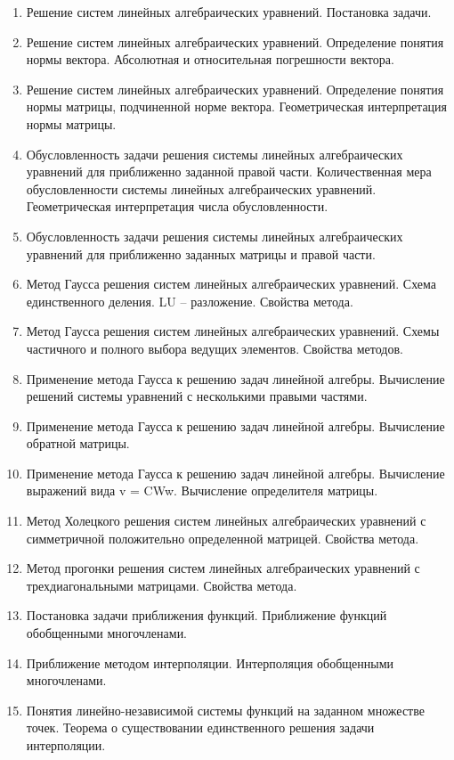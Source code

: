\documentclass[14pt]{extarticle}
\begin{document}
\begin{enumerate}
    \item Решение систем линейных алгебраических уравнений. Постановка задачи. 
    \item Решение систем линейных алгебраических уравнений. Определение понятия нормы вектора. Абсолютная и относительная погрешности вектора. 
    \item Решение систем линейных алгебраических уравнений. Определение понятия нормы матрицы, подчиненной норме вектора. Геометрическая интерпретация нормы матрицы. 
    \item Обусловленность задачи решения системы линейных алгебраических уравнений для приближенно заданной правой части. Количественная мера обусловленности системы линейных алгебраических уравнений. Геометрическая интерпретация числа обусловленности. 
    \item Обусловленность задачи решения системы линейных алгебраических уравнений для приближенно заданных матрицы и правой части. 
    \item Метод Гаусса решения систем линейных алгебраических уравнений. Схема единственного деления. LU – разложение. Свойства метода. 
    \item Метод Гаусса решения систем линейных алгебраических уравнений. Схемы частичного и полного выбора ведущих элементов. Свойства методов. 
    \item Применение метода Гаусса к решению задач линейной алгебры. Вычисление решений системы уравнений с несколькими правыми частями. 
    \item Применение метода Гаусса к решению задач линейной алгебры. Вычисление обратной матрицы. 
    \item Применение метода Гаусса к решению задач линейной алгебры. Вычисление выражений вида v = CWw. Вычисление определителя матрицы. 
    \item Метод Холецкого решения систем линейных алгебраических уравнений с симметричной положительно определенной матрицей. Свойства метода. 
    \item Метод прогонки решения систем линейных алгебраических уравнений с трехдиагональными матрицами. Свойства метода. 
    \item Постановка задачи приближения функций. Приближение функций обобщенными многочленами. 
    \item Приближение методом интерполяции. Интерполяция обобщенными многочленами. 
    \item Понятия линейно-независимой системы функций на заданном множестве точек. Теорема о существовании единственного решения задачи интерполяции. 

\end{enumerate}
\end{document}
